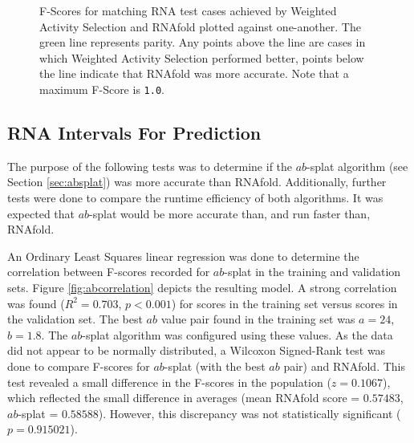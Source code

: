 \documentclass{cshonours}
\begin{document}
\begin{figure}
\begin{center}
\end{center}
\caption{F-Scores for matching RNA test cases achieved by Weighted Activity Selection and RNAfold plotted against one-another. The green line represents parity. Any points above the line are cases in which Weighted Activity Selection performed better, points below the line indicate that RNAfold was more accurate. Note that a maximum F-Score is \texttt{1.0}.}
\label{fig:wasrnafold}
\end{figure}


\subsection{RNA Intervals For Prediction}
\label{sec:res_absplat}
The purpose of the following tests was to determine if the $ab$-splat algorithm (see Section \ref{sec:absplat}) was more accurate than RNAfold. Additionally, further tests were done to compare the runtime efficiency of both algorithms. It was expected that $ab$-splat would be more accurate than, and run faster than, RNAfold.

An Ordinary Least Squares linear regression was done to determine the correlation between F-scores recorded for $ab$-splat in the training and validation sets. Figure \ref{fig:abcorrelation} depicts the resulting model. A strong correlation was found ($R^2 = 0.703$, $p < 0.001$) for scores in the training set versus scores in the validation set. The best $ab$ value pair found in the training set was $a = 24$, $b = 1.8$. The $ab$-splat algorithm was configured using these values. As the data did not appear to be normally distributed, a Wilcoxon Signed-Rank test was done to compare F-scores for $ab$-splat (with the best $ab$ pair) and RNAfold. This test revealed a small difference in the F-scores in the population ($z = 0.1067$), which reflected the small difference in averages (mean RNAfold score = $0.57483$, $ab$-splat = $0.58588$). However, this discrepancy was not statistically significant ($p = 0.915021$).
\end{document}
